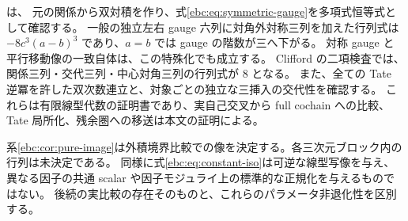 \begin{remark}[検算と結論の範囲]
\label{ebc:rem:scope}
 は、
元の関係から双対積を作り、式\eqref{ebc:eq:symmetric-gauge}を多項式恒等式として確認する。
一般の独立左右 gauge 六列に対角外対称三列を加えた行列式は
$-8c^3(a-b)^3$ であり、$a=b$ では gauge の階数が三へ下がる。
対称 gauge と平行移動像の一致自体は、この特殊化でも成立する。
Clifford の二項検査では、関係三列・交代三列・中心対角三列の行列式が $8$ となる。
また、全ての Tate 逆冪を許した双次数連立と、対象ごとの独立な三挿入の交代性を確認する。
これらは有限線型代数の証明書であり、実自己交叉から full cochain への比較、
Tate 局所化、残余圏への移送は本文の証明による。

系\ref{ebc:cor:pure-image}は外積境界比較での像を決定する。各三次元ブロック内の行列は未決定である。
同様に式\eqref{ebc:eq:constant-iso}は可逆な線型写像を与え、
異なる因子の共通 scalar や因子モジュライ上の標準的な正規化を与えるものではない。
後続の実比較の存在そのものと、これらのパラメータ非退化性を区別する。
\end{remark}
